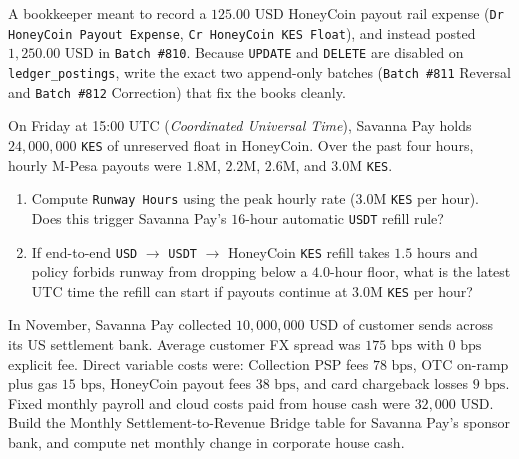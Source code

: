 \begin{exercise}
A bookkeeper meant to record a $125.00\text{ USD}$ HoneyCoin payout rail expense (\texttt{Dr HoneyCoin Payout Expense}, \texttt{Cr HoneyCoin KES Float}), and instead posted $1{,}250.00\text{ USD}$ in \texttt{Batch \#810}. Because \texttt{UPDATE} and \texttt{DELETE} are disabled on \texttt{ledger\_postings}, write the exact two append-only batches (\texttt{Batch \#811} Reversal and \texttt{Batch \#812} Correction) that fix the books cleanly.
\end{exercise}

\begin{exercise}
On Friday at 15:00 UTC (\emph{Coordinated Universal Time}), Savanna Pay holds $24{,}000{,}000$ \texttt{KES} of unreserved float in HoneyCoin. Over the past four hours, hourly M-Pesa payouts were $1.8\text{M}$, $2.2\text{M}$, $2.6\text{M}$, and $3.0\text{M}$ \texttt{KES}.
\begin{enumerate}
  \item Compute \texttt{Runway Hours} using the peak hourly rate ($3.0\text{M}$ \texttt{KES} per hour). Does this trigger Savanna Pay's $16\text{-hour}$ automatic \texttt{USDT} refill rule?
  \item If end-to-end \texttt{USD} $\to$ \texttt{USDT} $\to$ HoneyCoin \texttt{KES} refill takes $1.5\text{ hours}$ and policy forbids runway from dropping below a $4.0\text{-hour}$ floor, what is the latest UTC time the refill can start if payouts continue at $3.0\text{M}$ \texttt{KES} per hour?
\end{enumerate}
\end{exercise}

\begin{exercise}
In November, Savanna Pay collected $10{,}000{,}000\text{ USD}$ of customer sends across its US settlement bank. Average customer FX spread was $175\text{ bps}$ with $0\text{ bps}$ explicit fee. Direct variable costs were: Collection PSP fees $78\text{ bps}$, OTC on-ramp plus gas $15\text{ bps}$, HoneyCoin payout fees $38\text{ bps}$, and card chargeback losses $9\text{ bps}$. Fixed monthly payroll and cloud costs paid from house cash were $32{,}000\text{ USD}$. Build the Monthly Settlement-to-Revenue Bridge table for Savanna Pay's sponsor bank, and compute net monthly change in corporate house cash.
\end{exercise}
